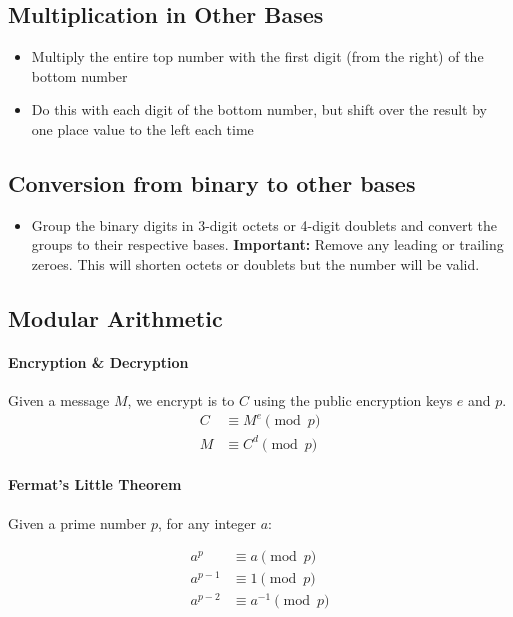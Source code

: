 \subsection{Multiplication in Other Bases}
\begin{itemize}
	\item Multiply the entire top number with the first digit (from the right) of the bottom number
	\item Do this with each digit of the bottom number, but shift over the result by one place value to the left each time
\end{itemize}

\subsection{Conversion from binary to other bases}
\begin{itemize}
	\item Group the binary digits in 3-digit octets or 4-digit doublets and convert the groups to their respective bases. \textbf{Important:} Remove any leading or trailing zeroes. This will shorten octets or doublets but the number will be valid.
\end{itemize}

\subsection{Modular Arithmetic}
\paragraph{Encryption \& Decryption} Given a message \(M\), we encrypt is to \(C\) using the public encryption keys \(e\) and \(p\).
\begin{align*}
	C & \equiv M^e \pmod{p} \\
	M & \equiv C^d \pmod{p}
\end{align*}

\paragraph{Fermat's Little Theorem} Given a prime number \(p\), for any integer \(a\):

\begin{align*}
	a^{p}   & \equiv a \pmod p      \\
	a^{p-1} & \equiv 1 \pmod p      \\
	a^{p-2} & \equiv a^{-1} \pmod p \\
\end{align*}

